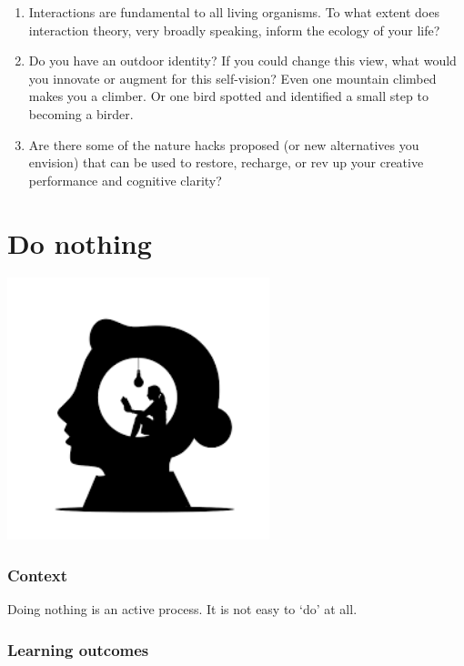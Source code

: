 \documentclass[
]{book}
\providecommand{\tightlist}{%
  \setlength{\itemsep}{0pt}\setlength{\parskip}{0pt}}
\begin{document}
\begin{enumerate}
\def\labelenumi{\arabic{enumi}.}
\tightlist
\item
  Interactions are fundamental to all living organisms. To what extent does interaction theory, very broadly speaking, inform the ecology of your life?\\
\item
  Do you have an outdoor identity? If you could change this view, what would you innovate or augment for this self-vision? Even one mountain climbed makes you a climber. Or one bird spotted and identified a small step to becoming a birder.\\
\item
  Are there some of the nature hacks proposed (or new alternatives you envision) that can be used to restore, recharge, or rev up your creative performance and cognitive clarity?
\end{enumerate}

\hypertarget{nothing}{%
\chapter{Do nothing}\label{nothing}}

\includegraphics[width=3in,height=\textheight]{./nothing.png}

\hypertarget{context-2}{%
\subsection*{Context}\label{context-2}}

Doing nothing is an active process. It is not easy to `do' at all.

\hypertarget{learning-outcomes-2}{%
\subsection*{Learning outcomes}\label{learning-outcomes-2}}
\end{document}
